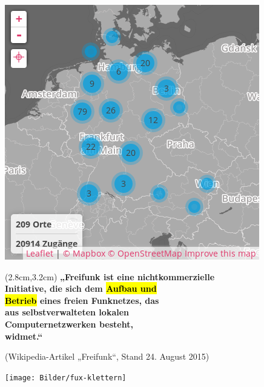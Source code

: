 \documentclass[t]{beamer}
\begin{document}
\begin{frame}{}
    \begin{center}
        \includegraphics[width=.7\textwidth]{Bilder/community-map-2015-09-22}
    \end{center}
\end{frame}




\begin{frame}{}
    \begin{textblock*}{9.2cm}(2.8cm,3.2cm)
        \Large\bf
        „Freifunk ist eine nicht\-kommerzielle \\
        Initiative, die sich dem \hl{\LARGE Aufbau und} \\
        \hl{\LARGE Betrieb} eines freien Funknetzes, das \\
        aus selbstverwalteten lokalen \\
        Computer\-netzwerken besteht, \\
        widmet.“
    \end{textblock*}

    \vspace{7cm}
    \hspace{4.1cm}
    {\scriptsize(Wikipedia-Artikel „Freifunk“, Stand 24. August 2015)}
\end{frame}

\begin{frame}{}
    \begin{center}
        \texttt{[image: Bilder/fux-klettern]}
    \end{center}
\end{frame}
\end{document}
